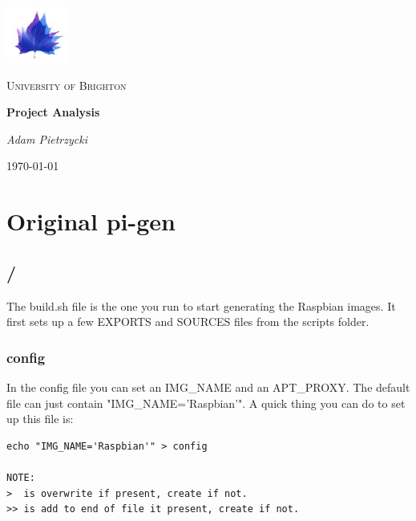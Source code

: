\documentclass[12pt,a4paper]{report}
\begin{document}
\sloppy
\begin{titlepage}
	\centering
	\includegraphics[width=0.15\textwidth]{Brighton-University-logo.png}\par
	{\scshape\LARGE University of Brighton\par}
	\vspace{1cm}
	{\scshape\Large \par}
	\vspace{1.5cm}
	{\huge\bfseries Project Analysis\par}
	\vspace{2cm}
	{\Large\itshape Adam Pietrzycki\par}
	\vfill
	\par
	\textsc{}
	\vfill
	{\large \today\par}
\end{titlepage}

\begin{abstract}
In this document I will be keeping a log of my approach and analysis of this project, note that not everything in this will be of any use.     
\end{abstract}

\pagebreak
\tableofcontents
\pagebreak

\chapter{Original pi-gen}
\section{/}
The build.sh file is the one you run to start generating the Raspbian images. It first sets up a few EXPORTS and SOURCES files from the scripts folder.
\subsection{config}
In the config file you can set an IMG\_NAME and an APT\_PROXY. The default file can just contain "IMG\_NAME='Raspbian'". A quick thing you can do to set up this file is: 
\begin{lstlisting}[frame=single]
echo "IMG_NAME='Raspbian'" > config

NOTE:
>  is overwrite if present, create if not.
>> is add to end of file it present, create if not.
\end{lstlisting}
\end{document}
